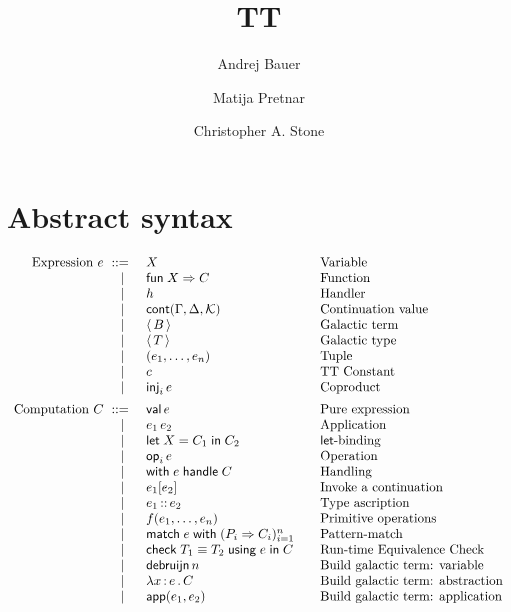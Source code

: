 \documentclass{article}
\newcommand{\C}{C}     %
\newcommand{\X}{X}     %
\newcommand{\rgn}{r}   %
\newcommand{\B}{B}     %
\newcommand{\KK}{{\cal K}} %
\newcommand{\val}{\mathsf{val}\,} %
\newcommand{\letin}[1]{\mathsf{let}\; #1 \;\mathsf{in}\;} %
\newcommand{\opOp}[2][i]{\mathsf{op}_{#1}\,#2} %
\newcommand{\withhandle}[1]{\mathsf{with}\;#1\;\mathsf{handle}\;} %
\newcommand{\abs}[1]{\mathsf{abs}\;#1\;\mathsf{in}\;} %
\newcommand{\new}[2]{\mathsf{new}(#1,#2)} %
\newcommand{\fun}[1]{\mathsf{fun}\;#1\Rightarrow} %
\newcommand{\ttapp}[2]{#1\,#2} %
\newcommand{\ttlam}[2]{\lambda #1 \,{:}\, #2 \,.\,} %
\newcommand{\kapp}[2]{#1{}[#2]} %
\newcommand{\bterm}[1]{\langle\,#1\,\rangle} %
\newcommand{\bty}[1]{\langle\,#1\,\rangle} %
\newcommand{\makeApp}[2]{\mathsf{app}(#1,#2)} %
\newcommand{\debruijn}[1]{\mathsf{debruijn}\,#1} %
\newcommand{\cont}[2][\G,\D]{\mathsf{cont}(#1,#2)}     %
\newcommand{\tuple}[1]{(#1)}
\newcommand{\generictuple}[1][n]{\tuple{e_1,\ldots,\e_{#1}}}
\newcommand{\pat}{P}
\newcommand{\match}[2]{\mathsf{match}\; #1\; \mathsf{with}\;#2}
\newcommand{\genericPats}[1][n]{(\pat_i \Rightarrow \C_i)_{i=1}^n}
\newcommand{\genericmatch}[1][\e]{\match{#1}{\genericPats}}
\renewcommand{\c}{c} %
\newcommand{\prim}[2][f]{#1(#2)} %
\newcommand{\genericprim}{\prim{\e_1,\ldots,\e_n}}
\newcommand{\inj}[2][i]{\mathsf{inj}_{#1}\, #2}
\newcommand{\assertEquivType}[3]{\mathsf{check}\;#1\equiv #2\;\mathsf{using}\;#3\;\mathsf{in}\;}
\begin{document}
\title{TT}
\author{Andrej Bauer \and Matija Pretnar \and Christopher A. Stone}
\maketitle

\section{Abstract syntax}
\label{sec:abstract-syntax}

\begin{equation*}
  \begin{array}{rl@{\qquad}l}
  \text{Expression $\e$}
    \bnf    & \X          & \text{Variable} \\
    \bnfor  & \fun{\X} \C  & \text{Function} \\
    \bnfor  & h           & \text{Handler} \\
    \bnfor  & \cont{\KK} & \text{Continuation value} \\
    \bnfor  & \bterm{\B}         & \text{Galactic term} \\
    \bnfor  & \bty{\T}           & \text{Galactic type} \\
    \bnfor  & \generictuple   & \text{Tuple}\\
    \bnfor  & \c              & \text{TT Constant}\\
    \bnfor  & \inj{\e}        & \text{Coproduct}\\[5pt]

    \text{Computation $\C$}
      \bnf  & \val \e                & \text{Pure expression} \\
    \bnfor  & \ttapp{\e_1}{\e_2}   & \text{Application} \\
    \bnfor  & \letin{\X = \C_1} \C_2  & \text{$\mathsf{let}$-binding} \\
    \bnfor  & \opOp{\e} & \text{Operation} \\
    \bnfor  & \withhandle{\e} \C & \text{Handling} \\
    \bnfor  & \kapp{\e_1}{\e_2}   & \text{Invoke a continuation} \\
    \bnfor  & \ascribe{\e_1}{\e_2} & \text{Type ascription} \\
    \bnfor  & \genericprim & \text{Primitive operations}\\
    \bnfor  & \genericmatch& \text{Pattern-match}\\
    \bnfor  & \assertEquivType{\T_1}{\T_2}{\e}{\C} & \text{Run-time Equivalence Check}\\
    \bnfor  & \debruijn{n} & \text{Build galactic term: variable} \\
    \bnfor  & \ttlam{\x}{\e} \C   & \text{Build galactic term: abstraction} \\
    \bnfor  & \makeApp{\e_1}{\e_2} & \text{Build galactic term: application} \\[5pt]


\end{array}
\end{equation*}
\end{document}
